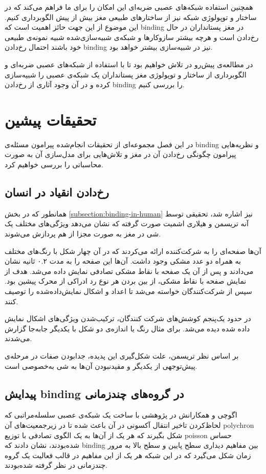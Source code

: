 \documentclass[12pt]{report}
\begin{document}
	همچنین استفاده شبکه‌های عصبی ضربه‌ای این امکان را برای ما فراهم می‌کند که در ساختار و توپولوژی شبکه نیز از ساختار‌های طبیعی مغز بیش از پیش الگوبرداری کنیم. این موضوع از این جهت  حائز اهمیت است که \gls{binding} در مغز پستانداران در حال رخ‌دادن است و هرچه بیشتر سازوکارها و شبکه‌ی شبیه‌سازی‌شده شبیه نمونه‌ی طبیعی خود باشند احتمال رخ‌دادن \gls{binding} نیز در شبیه‌سازی بیشتر خواهد بود.
	
	در مطالعه‌ی پیش‌رو در تلاش خواهیم بود تا با استفاده از شبکه‌های عصبی ضربه‌ای و الگوبرداری از ساختار و توپولوژی مغز پستانداران یک شبکه‌ی عصبی را شبیه‌سازی کرده و در آن وجود آثاری از رخ‌دادن \gls{binding} را بررسی کنیم.
	
	
	\chapter{تحقیقات پیشین}
	
	در این فصل مجموعه‌ای از تحقیقات انجام‌شده پیرامون مسئله‌ی \gls{binding} و نظریه‌هایی پیرامون چگونگی رخ‌دادن آن در مغز و تلاش‌هایی برای مدل‌سازی آن به صورت محاسباتی را بررسی خواهیم کرد.
	
	\section{رخ‌دادن انقیاد در انسان}
	همانطور که در بخش \ref{subsection:binding-in-human} نیز اشاره شد، تحقیقی توسط آنه تریسمن و هیلاری اشمیت صورت گرفته که نشان می‌دهد ویژگی‌های مختلف یک شی در مغز به صورت مجزا از هم پردازش می‌شوند. \cite{TREISMAN1982107}
	
	آن‌ها صفحه‌ای را به شرکت‌کننده ارائه می‌کردند که در آن چهار شکل با رنگ‌های مختلف به همراه دو عدد مشکی وجود داشت. آن‌ها این صفحه را به مدت ۰.۲ ثانیه نشان می‌دادند و پس از آن یک صفحه با نقاط مشکی تصادفی نمایش داده می‌شد. هدف از نمایش صفحه با نقاط مشکی، از بین بردن هر نوع رد ادراکی از محرک پیشین بود. سپس از شرکت‌کنندگان خواسته می‌شد تا اعداد و اشکال نمایش‌داده‌شده را توصیف کنند.
	
	در حدود یک‌پنجم کوشش‌های شرکت کنندگان، ترکیب‌شدن ویژگی‌های اشکال نمایش داده شده دیده می‌شد. برای مثال رنگ یا اندازه‌ی دو شکل با یکدیگر جابه‌جا گزارش می‌شدند.
	
	بر اساس نظر تریسمن، علت شکل‌گیری این پدیده، جدا‌بودن صفات در مرحله‌ی پیش‌توجهی از یکدیگر و مقید‌نبودن آن‌ها به شی‌ به‌خصوصی است. \cite{goldstein_2019}
	
	\section{پیدایش \gls{binding} در گروه‌های چندزمانی}
	اگوچی و همکارانش در پژوهشی
	\cite{EGUCHI2018a}
	با ساخت یک شبکه‌ی عصبی سلسله‌مراتبی که لحاظ‌کردن تاخیر انتقال آکسونی در آن باعث شده تا در زیرجمعیت‌های آن \gls{polychron}\cite{Izhikevich2006-dy} شکل بگیرند که هر یک از آن‌ها به یک الگوی تصادفی با توزیع \gls{poisson} حساس شده‌بودند، نشان دادند که \gls{binding} بین مفاهیم دیداری سطح پایین و سطح بالا به مرور زمان شکل می‌گیرد که در این شبکه هر یک از این مفاهیم در قالب فعالیت یک گروه چندزمانی در نظر گرفته‌ شده‌بودند.
	
\end{document}
